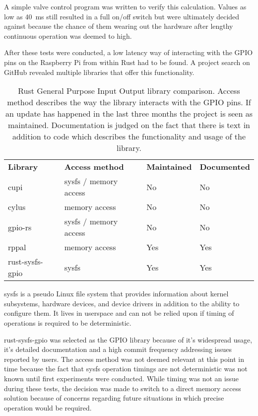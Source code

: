 A simple valve control program was written to verify this calculation. Values as low as \SI{40}{\milli\second} still resulted in a full on/off switch but were ultimately decided against because the chance of them wearing out the hardware after lengthy continuous operation was deemed to high.

After these tests were conducted, a low latency way of interacting with the GPIO pins on the Raspberry Pi from within Rust had to be found. A project search on GitHub revealed multiple libraries that offer this functionality. 

\begin{table}[h]
\centering
\begin{tabular}{llll}
\textbf{Library} & \textbf{Access method} & \textbf{Maintained} & \textbf{Documented} \\
cupi             & sysfs / memory access  & No                  & No                  \\
cylus            & memory access          & No                  & No                  \\
gpio-rs          & sysfs / memory access  & No                  & No                  \\
rppal            & memory access          & Yes                 & Yes                 \\
rust-sysfs-gpio  & sysfs                  & Yes                 & Yes
\end{tabular}
\caption{Rust General Purpose Input Output library comparison. Access method describes the way the library interacts with the GPIO pins. If an update has happened in the last three months the project is seen as maintained. Documentation is judged on the fact that there is text in addition to code which describes the functionality and usage of the library.}
\end{table}

sysfs is a pseudo Linux file system that provides information about kernel subsystems, hardware devices, and device drivers in addition to the ability to configure them. It lives in userspace and can not be relied upon if timing of operations is required to be deterministic. 

rust-sysfs-gpio \cite{rust-sysfs-gpio} was selected as the GPIO library because of it's widespread usage, it's detailed documentation and a high commit frequency addressing issues reported by users. The access method was not deemed relevant at this point in time because the fact that sysfs operation timings are not deterministic was not known until first experiments were conducted. While timing was not an issue during these tests, the decision was made to switch to a direct memory access solution because of concerns regarding future situations in which precise operation would be required. 

